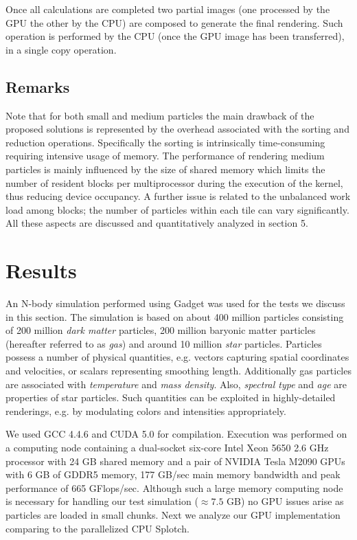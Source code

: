 \documentclass[1p]{elsarticle}
\begin{document}
Once all calculations are completed two partial images (one processed by the GPU the other by the CPU) are composed to generate the final rendering. Such operation is performed by the CPU (once the GPU image has been transferred), in a single copy operation. 

\subsection{Remarks}
Note that for both small and medium particles the main drawback of the proposed solutions
is represented by the overhead associated with the sorting and reduction operations. Specifically the sorting is intrinsically time-consuming requiring intensive usage of memory.
The performance of rendering medium particles is mainly influenced
by the size of shared memory which limits the number of resident blocks
per multiprocessor during the execution of the kernel, thus reducing device occupancy. 
A further issue is related to the unbalanced work load among blocks; the number of particles within each tile can vary significantly. All these aspects are discussed and quantitatively analyzed in section 5.

\section{Results}
\label{sec:results}


An N-body simulation performed using Gadget \cite{gadgeturl} was used for the tests we discuss in this section. The simulation is based on about 400 million particles consisting of 200 million {\it dark matter} particles, 200 million baryonic matter particles (hereafter referred to as {\it gas}) and around 10 million {\it star} particles. Particles possess a number of physical quantities, e.g. vectors capturing spatial coordinates and velocities, or scalars representing smoothing length. Additionally gas particles are associated with {\it temperature} and {\it mass density}. Also, {\it spectral type} and {\it age} are properties of star particles. Such quantities can be exploited in highly-detailed renderings, e.g. by modulating colors and intensities appropriately. 

We used GCC 4.4.6 and CUDA 5.0 for compilation. Execution was performed on a computing node containing a dual-socket six-core Intel Xeon 5650 2.6 GHz processor with 24 GB shared memory and a pair of NVIDIA Tesla M2090 GPUs with 6 GB of GDDR5 memory, 177 GB/sec main memory bandwidth and peak performance of 665 GFlops/sec. Although such a large memory computing node is necessary for handling our test simulation ($\approx 7.5$ GB) no GPU issues arise as particles are loaded in small chunks. Next we analyze our GPU implementation comparing to the parallelized CPU Splotch. 
\end{document}
